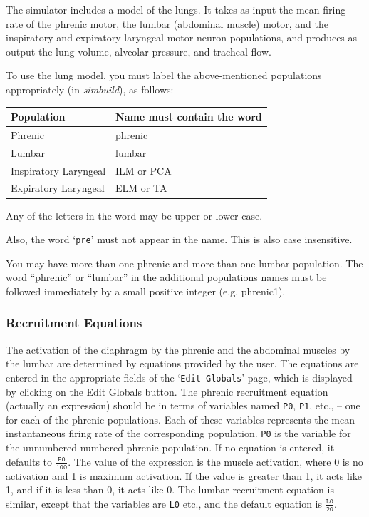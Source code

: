 \documentclass[12pt,openany,oneside]{book}
\newcommand{\ticode}[1]{\texttt{#1}}
\newcommand{\tmcode}[1]{\mathtt{#1}}
\newcommand{\tisamp}[1]{`\texttt{#1}'}
\newcommand{\prog}[1]{\textit{{#1}}}
\newcommand{\inquotes}[1]{{{``#1''}}}
\begin{document}
The simulator includes a model of the lungs. It takes as input the mean
firing rate of the phrenic motor, the lumbar (abdominal muscle)
motor, and the inspiratory and expiratory laryngeal motor neuron
populations, and produces as output the lung volume, alveolar pressure,
and tracheal flow.

To use the lung model, you must label the above-mentioned populations
appropriately (in \prog{simbuild}), as follows:

\label{Motor Populations}
\begin{flushleft}
\begin{tabular}{@{}ll@{}}
Population & Name must contain the word\\
\hline\noalign{\smallskip}
Phrenic & phrenic\\
Lumbar  & lumbar\\
Inspiratory Laryngeal & ILM or PCA\\
Expiratory Laryngeal & ELM or TA\\
\end{tabular}
\end{flushleft}

\noindent
Any of the letters in the word may be upper or lower case.

\noindent
Also, the word \tisamp{pre} must not appear in the name. This is also
case insensitive.

You may have more than one phrenic and more than one lumbar population.
The word \inquotes{phrenic} or \inquotes{lumbar} in the additional
populations names must be followed immediately by a small positive integer
(e.g. phrenic1).

\subsubsection{Recruitment Equations}
\label{Recruitment Equations}

The activation of the diaphragm by the phrenic and the abdominal
muscles by the lumbar are determined by equations provided by the
user. The equations are entered in the appropriate fields of the
\tisamp{Edit Globals} page, which is displayed 
by clicking on the Edit Globals button.
The phrenic recruitment equation (actually an expression) 
should be in terms of
variables named \ticode{P0}, \ticode{P1}, etc., -- one for each of the
phrenic populations. Each of these variables represents the mean
instantaneous firing rate of the corresponding population.
\ticode{P0} is the variable for the unnumbered-numbered phrenic population.
If no equation is entered, it defaults to $\tmcode{\tfrac{P0}{100}}$. The value
of the expression is the muscle activation, where 0 is no activation
and 1 is maximum activation. If the value is greater than 1, it acts
like 1, and if it is less than 0, it acts like 0. The lumbar
recruitment equation is similar, except that the variables are
\ticode{L0} etc., and the default equation is $\tmcode{\tfrac{L0}{20}}$.
\end{document}
